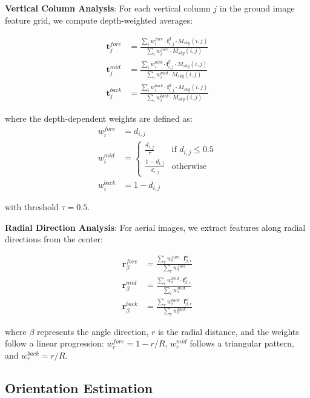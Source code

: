 \textbf{Vertical Column Analysis}: For each vertical column $j$ in the ground image feature grid, we compute depth-weighted averages:

\begin{align}
\mathbf{t}_j^{fore} &= \frac{\sum_{i} w_i^{fore} \cdot \mathbf{f}_{i,j}^g \cdot M_{sky}(i,j)}{\sum_{i} w_i^{fore} \cdot M_{sky}(i,j)} \\
\mathbf{t}_j^{mid} &= \frac{\sum_{i} w_i^{mid} \cdot \mathbf{f}_{i,j}^g \cdot M_{sky}(i,j)}{\sum_{i} w_i^{mid} \cdot M_{sky}(i,j)} \\
\mathbf{t}_j^{back} &= \frac{\sum_{i} w_i^{back} \cdot \mathbf{f}_{i,j}^g \cdot M_{sky}(i,j)}{\sum_{i} w_i^{back} \cdot M_{sky}(i,j)}
\end{align}

where the depth-dependent weights are defined as:
\begin{align}
w_i^{fore} &= d_{i,j} \\
w_i^{mid} &= \begin{cases} 
\frac{d_{i,j}}{\tau} & \text{if } d_{i,j} \leq 0.5 \\
\frac{1-d_{i,j}}{d_{i,j}} & \text{otherwise}
\end{cases} \\
w_i^{back} &= 1 - d_{i,j}
\end{align}

with threshold $\tau = 0.5$.

\textbf{Radial Direction Analysis}: For aerial images, we extract features along radial directions from the center:

\begin{align}
\mathbf{r}_\beta^{fore} &= \frac{\sum_{r} w_r^{fore} \cdot \mathbf{f}_{\beta,r}^a}{\sum_{r} w_r^{fore}} \\
\mathbf{r}_\beta^{mid} &= \frac{\sum_{r} w_r^{mid} \cdot \mathbf{f}_{\beta,r}^a}{\sum_{r} w_r^{mid}} \\
\mathbf{r}_\beta^{back} &= \frac{\sum_{r} w_r^{back} \cdot \mathbf{f}_{\beta,r}^a}{\sum_{r} w_r^{back}}
\end{align}

where $\beta$ represents the angle direction, $r$ is the radial distance, and the weights follow a linear progression: $w_r^{fore} = 1-r/R$, $w_r^{mid}$ follows a triangular pattern, and $w_r^{back} = r/R$.

\subsection{Orientation Estimation}

